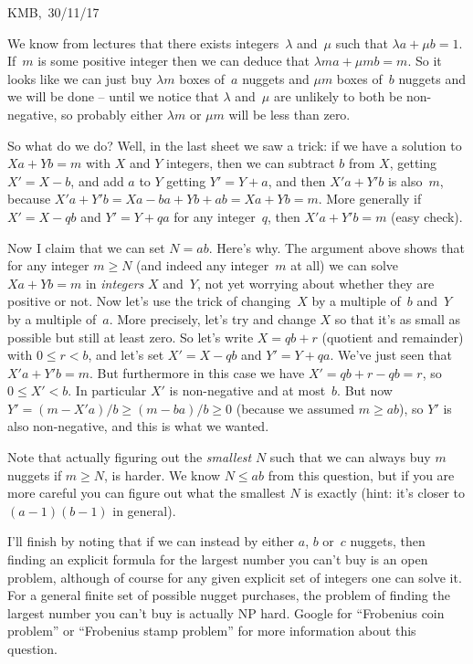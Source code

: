 \documentclass[10pt]{article}
\begin{document}
\begin{flushright} KMB,\ 30/11/17\end{flushright}


\medskip{} We know from lectures that there exists integers~$\lambda$ and~$\mu$ such that $\lambda a+\mu b=1$. If~$m$ is some positive integer then we can deduce that $\lambda m a+\mu m b=m$. So it looks like we can just buy $\lambda m$ boxes of~$a$ nuggets and $\mu m$ boxes of~$b$ nuggets and we will be done -- until we notice that $\lambda$ and~$\mu$ are unlikely to both be non-negative, so probably either $\lambda m$ or $\mu m$ will be less than zero.

So what do we do? Well, in the last sheet we saw a trick: if we have a solution to $Xa+Yb=m$ with $X$ and $Y$ integers, then we can subtract $b$ from $X$, getting $X'=X-b$, and add $a$ to $Y$ getting $Y'=Y+a$, and then $X'a+Y'b$ is also~$m$, because $X'a+Y'b=Xa-ba+Yb+ab=Xa+Yb=m$. More generally if $X'=X-qb$ and $Y'=Y+qa$ for any integer~$q$, then $X'a+Y'b=m$ (easy check).

Now I claim that we can set $N=ab$. Here's why. The argument above shows that for any integer $m\geq N$ (and indeed any integer~$m$ at all) we can solve $Xa+Yb=m$ in \emph{integers} $X$ and~$Y$, not yet worrying about whether they are positive or not. Now let's use the trick of changing~$X$ by a multiple of~$b$ and~$Y$ by a multiple of~$a$. More precisely, let's try and change $X$ so that it's as small as possible but still at least zero. So let's write $X=qb+r$ (quotient and remainder) with $0\leq r<b$, and let's set $X'=X-qb$ and $Y'=Y+qa$. We've just seen that $X'a+Y'b=m$. But furthermore in this case we have $X'=qb+r-qb=r$, so $0\leq X'<b$. In particular $X'$ is non-negative and at most~$b$. But now $Y'=(m-X'a)/b\geq (m-ba)/b\geq0$ (because we assumed $m\geq ab$), so $Y'$ is also non-negative, and this is what we wanted.

Note that actually figuring out the \emph{smallest} $N$ such that we can always buy $m$ nuggets if $m\geq N$, is harder. We know $N\leq ab$ from this question, but if you are more careful you can figure out what the smallest $N$ is exactly (hint: it's closer to $(a-1)(b-1)$ in general). 

I'll finish by noting that if we can instead by either $a$, $b$ or~$c$ nuggets, then finding an explicit formula for the largest number you can't buy is an open problem, although of course for any given explicit set of integers one can solve it. For a general finite set of possible nugget purchases, the problem of finding the largest number you can't buy is actually NP hard. Google for ``Frobenius coin problem'' or ``Frobenius stamp problem'' for more information about this question.
\end{document}
